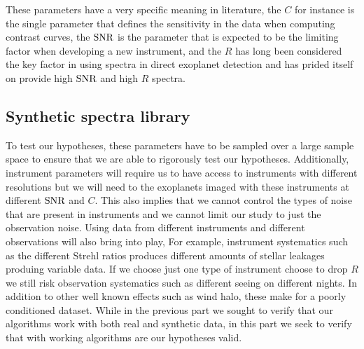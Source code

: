 These parameters have a very specific meaning in literature,
the $C$ for instance is the single parameter that defines the sensitivity in the data when computing contrast curves,
the $\rm{SNR}$ is the parameter that is expected to be the limiting factor when developing a new instrument,
and the $R$ has long been considered the key factor in using spectra in direct exoplanet detection and \citep[KPIC, ][]{2016Mawet} has prided itself on provide high $\rm{SNR}$ and high $R$ spectra.
\subsection{Synthetic spectra library}
To test our hypotheses, these parameters have to be sampled over a large sample space to ensure that we are able to rigorously test our hypotheses.
Additionally, instrument parameters will require us to have access to instruments with different resolutions but we will need to the exoplanets imaged with these instruments at different $\rm{SNR}$ and $C$.
This also implies that we cannot control the types of noise that are present in instruments and we cannot limit our study to just the observation noise.
Using data from different instruments and different observations will also bring into play,
For example, instrument systematics such as the different Strehl ratios produces different amounts of stellar leakages produing variable data.
If we choose just one type of instrument choose to drop $R$ we still risk observation systematics such as different seeing on different nights. 
In addition to other well known effects such as wind halo, these make for a poorly conditioned dataset. 
While in the previous part we sought to verify that our algorithms work with both real and synthetic data, in this part we seek to verify that with working algorithms are our hypotheses valid.

